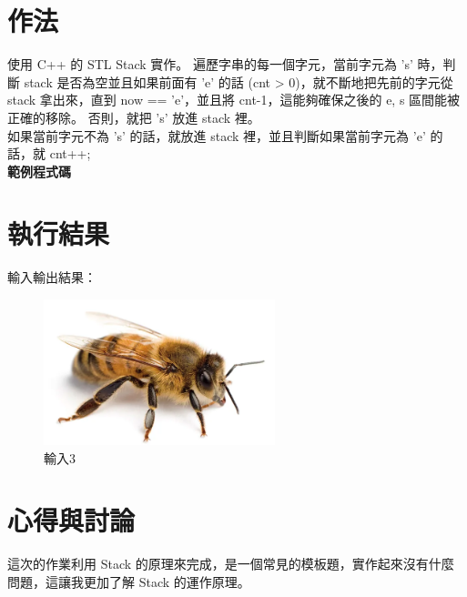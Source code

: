 \documentclass[12pt, a4paper]{article}
\begin{document}
  \section{\fontsize{20pt}{22pt}\selectfont 作法}
  \begin{samepage}
    \fontsize{16pt}{18pt} \selectfont
      使用 C++ 的 STL Stack 實作。
      遍歷字串的每一個字元，當前字元為 's' 時，判斷 stack 是否為空並且如果前面有 'e' 的話 (cnt > 0)，就不斷地把先前的字元從 stack 拿出來，直到 now == 'e'，並且將 cnt-1，這能夠確保之後的 e, s 區間能被正確的移除。
      否則，就把 's' 放進 stack 裡。 \\
      如果當前字元不為 's' 的話，就放進 stack 裡，並且判斷如果當前字元為 'e' 的話，就 cnt++;\\
      \textbf{範例程式碼}  
    
    \normalfont
  \end{samepage}

  \section{\fontsize{20pt}{22pt}\selectfont 執行結果}
      \fontsize{16pt}{18pt} \selectfont
        輸入輸出結果：
        \begin{figure}[ht]
          \centering
          \includegraphics[width=0.6\textwidth]{./image/bee.png}
          \caption{輸入3}
        \end{figure}
      \normalsize

  \section{\fontsize{20pt}{22pt}\selectfont 心得與討論}
  \begin{samepage}
    \fontsize{16pt}{18pt} \selectfont
      這次的作業利用 Stack 的原理來完成，是一個常見的模板題，實作起來沒有什麼問題，這讓我更加了解 Stack 的運作原理。
    \normalfont
  \end{samepage}
\end{document}
